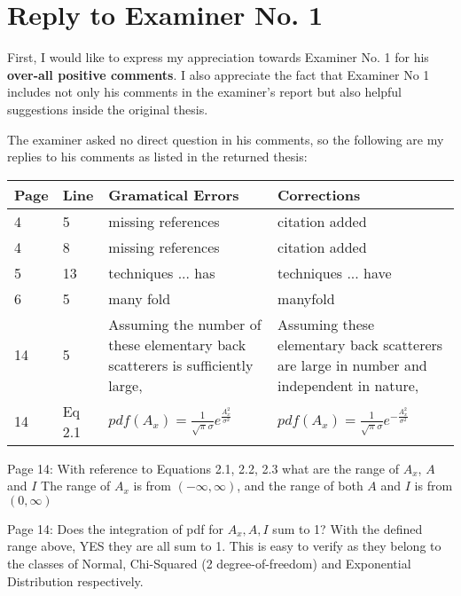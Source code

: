 \section*{Reply to Examiner No. 1}

\begin{replyheader}
\end{replyheader}  

First, I would like to express my appreciation towards Examiner No. 1 for his \textbf{over-all positive comments}.
I also appreciate the fact that Examiner No 1 includes
  not only his comments in the examiner's report
  but also helpful suggestions inside the original thesis.
  
The examiner asked no direct question in his comments, so the following are my replies to his comments as listed in the returned thesis:

\noindent
\begin{longtable}[c]{p{}|p{}|p{}|p{}}
\textbf{Page} & \textbf{Line} & \textbf{Gramatical Errors} & \textbf{Corrections} \\
 \hline
\endhead
4 & 5 & missing references & citation added \\
4 & 8 & missing references & citation added \\
5 & 13 & techniques ... has & techniques ... have \\
6 & 5 & many fold & manyfold \\
14 & 5 & Assuming the number of these elementary back scatterers is sufficiently large, & Assuming these elementary back scatterers are large in number and independent in nature, \\
14 & Eq 2.1 & $pdf(A_x)=\frac{1}{\sqrt{\pi}\sigma} e^{\frac{A_x^2}{\sigma^2}}$ & $pdf(A_x)=\frac{1}{\sqrt{\pi}\sigma} e^{-\frac{A_x^2}{\sigma^2}}$ \\
\end{longtable}    

\replyToComment
    {Page 14: With reference to Equations 2.1, 2.2, 2.3 what are the range of $A_x$, $A$ and $I$}
    {The range of $A_x$ is from $(-\infty, \infty)$, and the range of both $A$ and $I$ is from $(0,\infty)$} 

\replyToComment
  {Page 14: Does the integration of pdf for $A_x,A,I$ sum to 1?}
  {With the defined range above, YES they are all sum to 1. This is easy to verify as they belong to the classes of Normal, Chi-Squared (2 degree-of-freedom) and Exponential Distribution respectively.}

